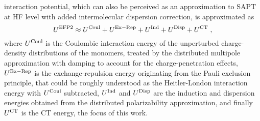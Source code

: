 \documentclass[aip,jcp,amsmath,amssymb,reprint,floatfix]{revtex4-1}
\begin{document}
interaction potential, which can also be perceived as an approximation
to SAPT at HF level with added intermolecular dispersion correction, is approximated as 
%
\begin{equation}\label{e:u-efp2}
 U^{\rm EFP2} \approx U^{\rm Coul} + U^{\rm Ex-Rep} + U^{\rm Ind} + U^{\rm Disp} + U^{\rm CT} \;,
\end{equation}
%
where $U^{\rm Coul}$ is the Coulombic interaction energy of the unperturbed charge\hyp{}density
distributions of the monomers, treated by the distributed multipole approximation
with damping to account for the charge\hyp{}penetration effects,\cite{Slipchenko.Gordon.JCC.2007}
$U^{\rm Ex-Rep}$ is the exchange\hyp{}repulsion energy originating from the Pauli exclusion
principle,\cite{Jensen.Gordon.MolPhys.1996,Jensen.Gordon.JCP.1998} 
that could be roughly understood as the Heitler\hyp{}London interaction
energy\cite{Chalasinski.Gutowski.MolPhys.1985} with $U^{\rm Coul}$ subtracted, $U^{\rm Ind}$ and $U^{\rm Disp}$
are the induction and dispersion energies obtained from the distributed polarizability
approximation,\cite{Li.Netzloff.Gordon.JCP.2006,Adamovic.Gordon.MolPhys.2005,Xu.Zahariev.Gordon.JCTC.2014} 
and finally $U^{\rm CT}$ is the CT energy,\cite{Li.Gordon.Jensen.JCP.2006,Xu.Gordon.JCP.2013} 
the focus of this work.
\end{document}
